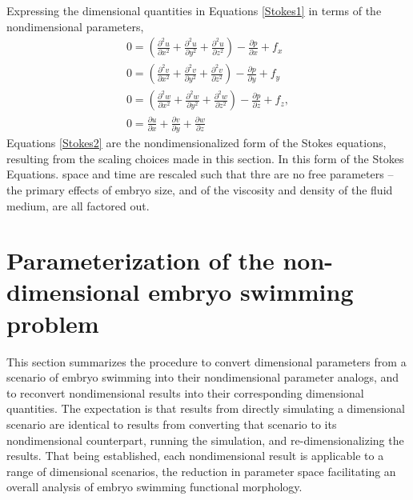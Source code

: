 \documentclass[10pt,a4paper]{article}
\def\non{\nonumber}
\def\p{\partial}
\begin{document}
Expressing the dimensional quantities in Equations \ref{Stokes1} in terms of the nondimensional parameters, %
\begin{eqnarray}\label{Stokes2}
	0 = \left( \frac{\p^2 u}{\p x^2}+\frac{\p^2 u}{\p y^2}+\frac{\p^2 u}{\p z^2} \right) - \frac{\p p}{\p x} + f_x \non \\
	0 = \left( \frac{\p^2 v}{\p x^2}+\frac{\p^2 v}{\p y^2}+\frac{\p^2 v}{\p z^2} \right) - \frac{\p p}{\p y} + f_y \non \\
	0 = \left( \frac{\p^2 w}{\p x^2}+\frac{\p^2 w}{\p y^2}+\frac{\p^2 w}{\p z^2} \right) - \frac{\p p}{\p z} + f_z , \non \\
	0 =  \frac{\p u}{\p {x}}+\frac{\p v}{\p {y}}+\frac{\p w}{\p {z}}
\end{eqnarray}
Equations \ref{Stokes2} are the nondimensionalized form of the Stokes equations, resulting from the scaling choices made in this section.
In this form of the Stokes Equations. space and time are rescaled such that thre are no free parameters -- the primary effects of embryo size, and of the viscosity and density of the fluid medium, are all factored out.  

\section{Parameterization of the non-dimensional embryo swimming problem}\label{NDparsSect}
This section summarizes the procedure to convert dimensional parameters from a scenario of embryo swimming into their nondimensional parameter analogs, and to reconvert nondimensional results into their corresponding dimensional quantities.
The expectation is that results from directly simulating a dimensional scenario are identical to results from converting that scenario to its nondimensional counterpart, running the simulation, and re-dimensionalizing the results.
That being established, each nondimensional result is applicable to a range of dimensional scenarios, the reduction in parameter space facilitating an overall analysis of embryo swimming functional morphology.
\end{document}

